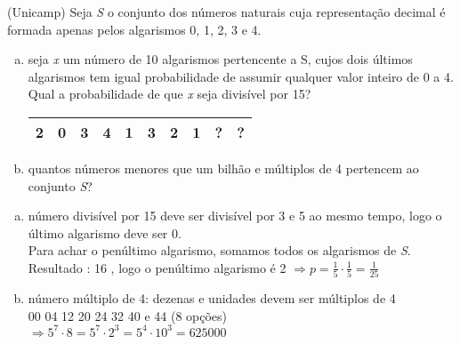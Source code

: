 \begin{ex}
 (Unicamp) Seja \textit{S} o conjunto dos números naturais cuja representação decimal é formada apenas pelos algarismos 0, 1, 2, 3 e 4.
    \begin{enumerate}[(a)]
    \item seja \textit{x} um número de 10 algarismos pertencente a S, cujos dois últimos algarismos tem igual probabilidade de assumir qualquer valor inteiro de 0 a 4. Qual a probabilidade de que \textit{x} seja divisível por 15?
    \begin{center}
\begin{tabular} {|c|c|c|c|c|c|c|c|c|c|} \hline
2 & 0 & 3 & 4 & 1 & 3 & 2 & 1 & ? & ? \\ \hline
\end{tabular}
\end{center}
    \item  quantos números menores que um bilhão e múltiplos de 4 pertencem ao conjunto \textit{S}?
    \end{enumerate}

  \begin{sol}
    \phantom{A} 
      \begin{enumerate} [(a)]
          \item número divisível por 15 deve ser divisível por 3 e 5 ao mesmo tempo, logo o último algarismo deve ser 0.\\
          Para achar o penúltimo algarismo, somamos todos os algarismos de \textit{S}.\\Resultado : 16 , logo o penúltimo algarismo é 2
          $\Longrightarrow p=\frac{1}{5}\cdot\frac{1}{5}=\frac{1}{25}$
          \item número múltiplo de 4: dezenas e unidades devem ser múltiplos de 4 \\ 00  04  12  20  24  32  40 e 44  (8 opções) \\
          $\Longrightarrow5^7\cdot8 = 5^7\cdot2^3 =5^4\cdot{10}^3=625000$
      \end{enumerate}
  \end{sol}
\end{ex}